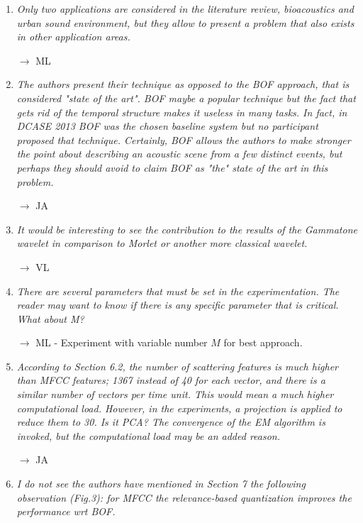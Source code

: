 \documentclass[10pt]{article}
\begin{document}
\begin{enumerate}

\item \emph{Only two applications are considered in the literature review, bioacoustics and urban sound environment, but they allow to present a problem that also exists in other application areas.}

$\rightarrow$ ML

\item \emph{The authors present their technique as opposed to the BOF approach, that is considered "state of the art". BOF maybe a popular technique but the fact that gets rid of the temporal structure makes it useless in many tasks. In fact, in DCASE 2013 BOF was the chosen baseline system but no participant proposed that technique. Certainly, BOF allows the authors to make stronger the point about describing an acoustic scene from a few distinct events, but perhaps they should avoid to claim BOF as "the" state of the art in this problem.}

$\rightarrow$ JA

\item \emph{It would be interesting to see the contribution to the results of the Gammatone wavelet in comparison to Morlet or another more classical wavelet.}

$\rightarrow$ VL

\item \emph{There are several parameters that must be set in the experimentation. The reader may want to know if there is any specific parameter that is critical. What about M?}

$\rightarrow$ ML - Experiment with variable number $M$ for best approach.

\item \emph{According to Section 6.2, the number of scattering features is much higher than MFCC features; 1367 instead of 40 for each vector, and there is a similar number of vectors per time unit. This would mean a much higher computational load. However, in the experiments, a projection is applied to reduce them to 30. Is it PCA? The convergence of the EM  algorithm is invoked, but the computational load may be an added reason.}

$\rightarrow$ JA

\item \emph{I do not see the authors have mentioned in Section 7 the following observation (Fig.3): for MFCC the relevance-based quantization improves the performance wrt BOF.}


\end{enumerate}
\end{document}
